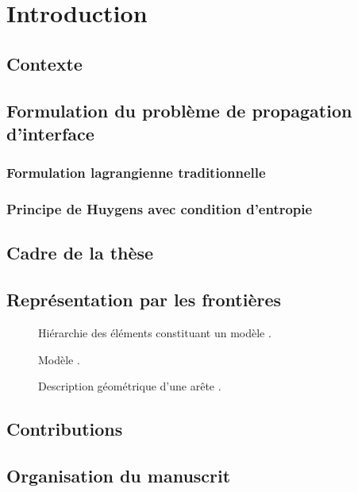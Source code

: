 \def\chapterabstract{}
\chapter{Introduction}

\section{Contexte}


\section{Formulation du problème de propagation d'interface}

\subsection{Formulation lagrangienne traditionnelle}

\subsection{Principe de Huygens avec condition d'entropie}


\section{Cadre de la thèse}


\section{Représentation par les frontières}




\begin{figure}
	\centering
	
	\caption{Hiérarchie des éléments constituant un modèle \brep.}
	\label{fig:BRep_hierarchy}
\end{figure}

\begin{figure}
	\centering
	
	\caption{Modèle \brep.}
	\label{fig:BRep}
\end{figure}

\begin{figure}
	\centering
	
	\caption{Description géométrique d'une arête \brep.}
\end{figure}




\section{Contributions}


\section{Organisation du manuscrit}